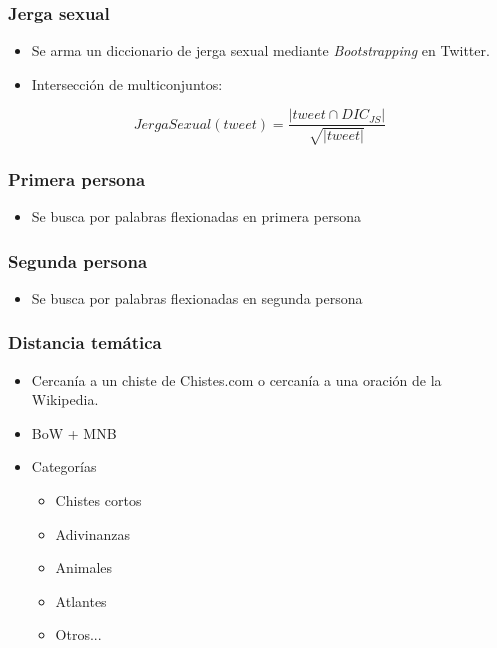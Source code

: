 \begin{frame}
    \frametitle{Jerga sexual}

    \begin{itemize}
        \item Se arma un diccionario de jerga sexual mediante \emph{Bootstrapping} en Twitter.
        \item Intersección de multiconjuntos:
    \end{itemize}

    \begin{center}
        \[
            JergaSexual(tweet) = \frac{|tweet \cap DIC_{JS}|}{\sqrt{|tweet|}}
        \]
    \end{center}
\end{frame}

\begin{frame}
    \frametitle{Primera persona}

    \begin{itemize}
        \item Se busca por palabras flexionadas en primera persona
    \end{itemize}
\end{frame}

\begin{frame}
    \frametitle{Segunda persona}

    \begin{itemize}
        \item Se busca por palabras flexionadas en segunda persona
    \end{itemize}
\end{frame}

\begin{frame}
    \frametitle{Distancia temática}

    \begin{itemize}[<+->]
        \item Cercanía a un chiste de Chistes.com o cercanía a una oración de la Wikipedia.
        \item BoW + MNB
        \item Categorías
        \begin{itemize}[<+->]
            \item Chistes cortos
            \item Adivinanzas
            \item Animales
            \item Atlantes
            \item Otros...
        \end{itemize}
    \end{itemize}
\end{frame}

